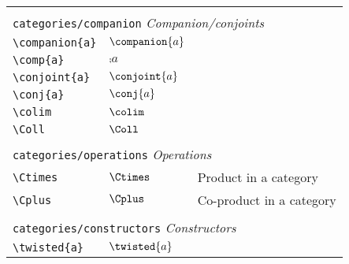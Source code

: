 \begin{longtable}{lll}
  &                            &                                                         \\
  \multicolumn{3}{l}{{\color[rgb]{0.5,0.5,0.5}\texttt{categories/companion}} \emph{Companion/conjoints}}
  \\
  \hline
  {\color[rgb]{0.5,0.5,0.5}\texttt{\textbackslash companion\{a\}}}                                          & $\companion{a}$
  & \\
  {\color[rgb]{0.5,0.5,0.5}\texttt{\textbackslash comp\{a\}}}                                               & $\comp{a}$                 & \\
  {\color[rgb]{0.5,0.5,0.5}\texttt{\textbackslash conjoint\{a\}}}                                           & $\conjoint{a}$             & \\
  {\color[rgb]{0.5,0.5,0.5}\texttt{\textbackslash conj\{a\}}}                                               & $\conj{a}$                 & \\
  {\color[rgb]{0.5,0.5,0.5}\texttt{\textbackslash colim}}                                                   & $\colim$                   & \\
  {\color[rgb]{0.5,0.5,0.5}\texttt{\textbackslash Coll}}                                                    & $\Coll$                    &                                                         \\
  &                            &                                                         \\
  \multicolumn{3}{l}{{\color[rgb]{0.5,0.5,0.5}\texttt{categories/operations}} \emph{Operations}}
  \\
  \hline
  {\color[rgb]{0.5,0.5,0.5}\texttt{\textbackslash Ctimes}}                                                  & $\Ctimes$                  & Product in a category\\
  {\color[rgb]{0.5,0.5,0.5}\texttt{\textbackslash Cplus}}                                                   & $\Cplus$                   & Co-product in a category                                \\
  &                            &                                                         \\
  \multicolumn{3}{l}{{\color[rgb]{0.5,0.5,0.5}\texttt{categories/constructors}} \emph{Constructors}}
  \\
  \hline
  {\color[rgb]{0.5,0.5,0.5}\texttt{\textbackslash twisted\{a\}}}                                            & $\twisted{a}$              & \\

\end{longtable}

